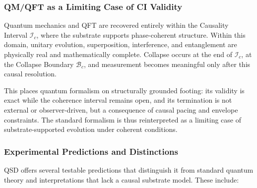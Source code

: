 \documentclass[preprints,article,submit,pdftex,moreauthors]{Definitions/mdpi}
\begin{document}
\subsubsection{QM/QFT as a Limiting Case of CI Validity}

Quantum mechanics and QFT are recovered entirely within the Causality Interval \( \mathcal{I}_c \), where the substrate supports phase-coherent structure. Within this domain, unitary evolution, superposition, interference, and entanglement are physically real and mathematically complete. Collapse occurs at the end of \( \mathcal{I}_c \), at the Collapse Boundary \( \mathcal{B}_c \), and measurement becomes meaningful only after this causal resolution.

This places quantum formalism on structurally grounded footing: its validity is exact while the coherence interval remains open, and its termination is not external or observer-driven, but a consequence of causal pacing and envelope constraints. The standard formalism is thus reinterpreted as a limiting case of substrate-supported evolution under coherent conditions.

\subsubsection{Experimental Predictions and Distinctions}

QSD offers several testable predictions that distinguish it from standard quantum theory and interpretations that lack a causal substrate model. These include:
\end{document}
